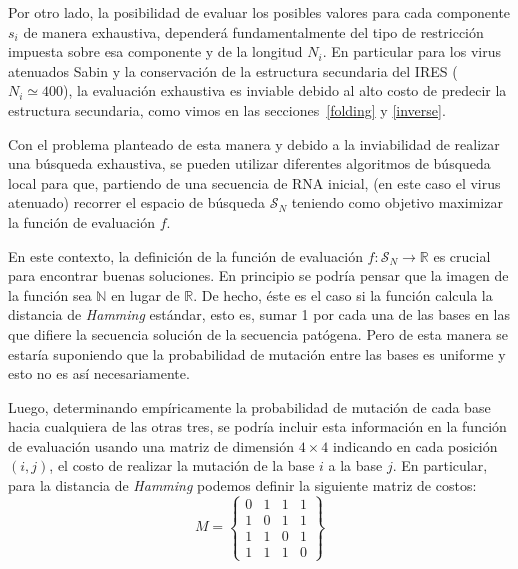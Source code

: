 Por otro lado, la posibilidad de evaluar los posibles valores para cada
componente $s_{i}$ de manera exhaustiva, depender\'a fundamentalmente del tipo
de restricci\'on impuesta sobre esa componente y de la longitud $N_{i}$. En
particular para los virus atenuados Sabin y la conservaci\'on de la estructura
secundaria del \ac{IRES} ($N_{i} \simeq 400$), la evaluaci\'on exhaustiva es
inviable debido al alto costo de predecir la estructura secundaria,
como vimos en las secciones~\ref{folding} y \ref{inverse}.

Con el problema planteado de esta manera y debido a la inviabilidad de realizar
una b\'usqueda exhaustiva, se pueden utilizar diferentes algoritmos de
b\'usqueda local para que, partiendo de una secuencia de \ac{RNA} inicial, (en
este caso el virus atenuado) recorrer el espacio de b\'usqueda $\mathcal{S}_{N}$
teniendo como objetivo maximizar la funci\'on de evaluaci\'on $f$.

En este contexto, la definici\'on de la funci\'on de evaluaci\'on $f:
\mathcal{S}_{N} \rightarrow \mathbb{R}$ es crucial para encontrar buenas
soluciones. En principio se podr\'ia pensar que la imagen de la funci\'on sea
$\mathbb{N}$ en lugar de $\mathbb{R}$. De hecho, \'este es el caso si la
funci\'on calcula la distancia de \textit{Hamming} est\'andar, esto es, sumar 1
por cada una de las bases en las que difiere la secuencia soluci\'on de la
secuencia pat\'ogena. Pero de esta manera se estar\'ia suponiendo que la
probabilidad de mutaci\'on entre las bases es uniforme y esto no es as\'i
necesariamente. 

Luego, determinando emp\'iricamente la probabilidad de mutaci\'on de cada base
hacia cualquiera de las otras tres, se podr\'ia incluir esta informaci\'on en la
funci\'on de evaluaci\'on usando una matriz de dimensi\'on $4\times4$ indicando
en cada posici\'on $(i,j)$, el costo de realizar la mutaci\'on de la base $i$ a
la base $j$. En particular, para la distancia de \textit{Hamming} podemos
definir la siguiente matriz de costos:
\[
M = 
\begin{Bmatrix}
 0 & 1 & 1 & 1\\
 1 & 0 & 1 & 1\\
 1 & 1 & 0 & 1\\
 1 & 1 & 1 & 0
\end{Bmatrix}
\]

